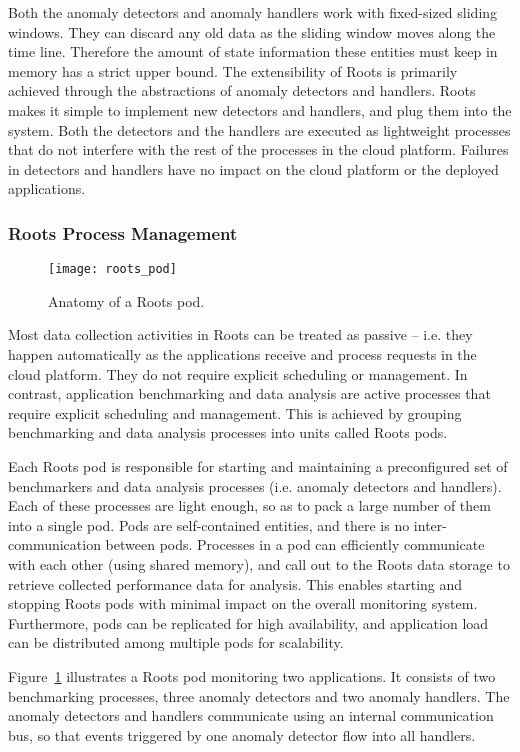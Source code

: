 Both the anomaly detectors and anomaly handlers work with fixed-sized sliding windows.
They can discard any old data as the sliding window moves along the time line.
Therefore the amount of state information these entities must keep in memory has
a strict upper bound. 
The extensibility of Roots is primarily achieved through the abstractions of anomaly
detectors and handlers. Roots makes it simple to implement new detectors and handlers,
and plug them into the system. Both the detectors and the handlers are executed
as lightweight processes that do not interfere with the rest of the processes in
the cloud platform. Failures in detectors and handlers have no impact
on the cloud platform or the deployed applications.

\subsubsection{Roots Process Management}
\begin{figure}
\centering
\texttt{[image: roots\_pod]}
\caption{Anatomy of a Roots pod.}
\label{fig:roots_pod}
\end{figure}
Most data collection activities in Roots can be treated as passive -- i.e. they
happen automatically as the applications receive and process requests in the cloud
platform. They do not require explicit scheduling or management. In contrast,
application benchmarking and data analysis are active processes that require
explicit scheduling and management.  This is achieved by grouping benchmarking
and data analysis processes into units called Roots pods. 

Each Roots pod is responsible for starting and maintaining a preconfigured set of
benchmarkers and data analysis processes (i.e. anomaly detectors and handlers). 
Each of these processes are light enough, so as to pack a large number of them
into a single pod. Pods are self-contained entities, and there is no inter-communication
between pods. Processes in a pod can efficiently communicate with each other 
(using shared memory), and call out to the Roots data storage to retrieve 
collected performance data for analysis. This enables starting and stopping 
Roots pods with minimal impact on the overall monitoring system. Furthermore, pods
can be replicated for high availability, and application load can be distributed
among multiple pods for scalability.

Figure~\ref{fig:roots_pod} illustrates a Roots pod monitoring two applications.
It consists of two benchmarking processes, three anomaly detectors and 
two anomaly handlers. The anomaly detectors and handlers communicate
using an internal communication bus, so that events triggered by one anomaly
detector flow into all handlers. 

